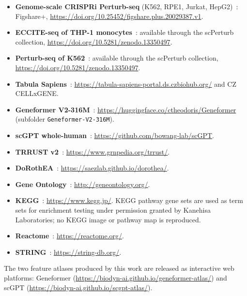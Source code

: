 \documentclass[onecolumn,11pt]{article}
\begin{document}
\begin{itemize}\itemsep2pt
\item \textbf{Genome-scale CRISPRi Perturb-seq} (K562, RPE1, Jurkat, HepG2)~\cite{replogle2022mapping}:
Figshare+, \url{https://doi.org/10.25452/figshare.plus.20029387.v1}.
\item \textbf{ECCITE-seq of THP-1 monocytes}~\cite{papalexi2021eccite}: available through the
scPerturb collection, \url{https://doi.org/10.5281/zenodo.13350497}.
\item \textbf{Perturb-seq of K562}~\cite{norman2019exploring}: available through the scPerturb
collection, \url{https://doi.org/10.5281/zenodo.13350497}.
\item \textbf{Tabula Sapiens}~\cite{tabula2022tabula}:
\url{https://tabula-sapiens-portal.ds.czbiohub.org/} and CZ CELLxGENE.
\item \textbf{Geneformer V2-316M}~\cite{theodoris2023transfer}:
\url{https://huggingface.co/ctheodoris/Geneformer} (subfolder \texttt{Geneformer-V2-316M}).
\item \textbf{scGPT whole-human}~\cite{cui2024scgpt}: \url{https://github.com/bowang-lab/scGPT}.
\item \textbf{TRRUST v2}~\cite{han2018trrust}: \url{https://www.grnpedia.org/trrust/}.
\item \textbf{DoRothEA}~\cite{garcia-alonso2019dorothea}: \url{https://saezlab.github.io/dorothea/}.
\item \textbf{Gene Ontology}~\cite{ashburner2000go}: \url{http://geneontology.org/}.
\item \textbf{KEGG}~\cite{kanehisa2000kegg}: \url{https://www.kegg.jp/}. KEGG pathway gene sets are
used as term sets for enrichment testing under permission granted by Kanehisa Laboratories; no
KEGG image or pathway map is reproduced.
\item \textbf{Reactome}~\cite{jassal2020reactome}: \url{https://reactome.org/}.
\item \textbf{STRING}~\cite{szklarczyk2023string}: \url{https://string-db.org/}.
\end{itemize}

\noindent
The two feature atlases produced by this work are released as interactive web platforms:
Geneformer (\url{https://biodyn-ai.github.io/geneformer-atlas/}) and scGPT
(\url{https://biodyn-ai.github.io/scgpt-atlas/}).
\end{document}
